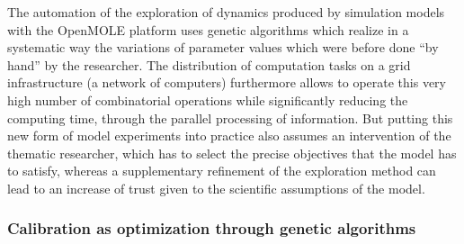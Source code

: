 \documentclass[10pt]{article}
\begin{document}
The automation of the exploration of dynamics produced by simulation models with the OpenMOLE platform uses genetic algorithms which realize in a systematic way the variations of parameter values which were before done ``by hand'' by the researcher. The distribution of computation tasks on a grid infrastructure (a network of computers) furthermore allows to operate this very high number of combinatorial operations while significantly reducing the computing time, through the parallel processing of information. But putting this new form of model experiments into practice also assumes an intervention of the thematic researcher, which has to select the precise objectives that the model has to satisfy, whereas a supplementary refinement of the exploration method can lead to an increase of trust given to the scientific assumptions of the model.


\subsubsection*{Calibration as optimization through genetic algorithms}
\end{document}
